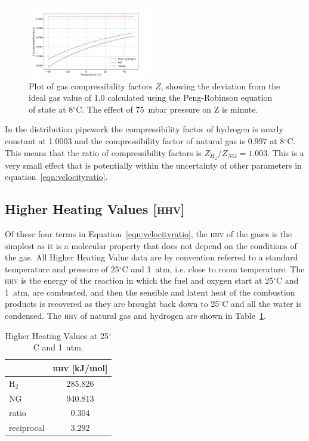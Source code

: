 \documentclass[5p]{elsarticle} %
\begin{document}
\begin{figure}[htbp]
\centering
\includegraphics[width=0.48\textwidth]{peng_z.png}
\caption{Plot of gas compressibility factors $Z$, showing the deviation from the ideal gas value of 1.0 calculated using the Peng-Robinson equation of state at 8$^\circ$C\citep{Sargents_github}. The effect of 75~mbar pressure on Z is minute.}
\label{fig:peng_z}
\end{figure}

In the distribution pipework the compressibility factor of hydrogen is nearly constant at 1.0003 and the compressibility factor of natural gas is 0.997 at 8$^\circ$C\citep{Sargents_github}.
This means that the ratio of compressibility factors is $Z_{H_2} / Z_{NG} = 1.003$.
This is a very small effect that is potentially within the uncertainty of other parameters in equation~\eqref{eqn:velocityratio}.

\subsection{Higher Heating Values \textsc{[hhv]}}
\label{sec:hhv}

Of these four terms in Equation~\eqref{eqn:velocityratio}, the \textsc{hhv} of the gases is the simplest as it is a molecular property that does not depend on the conditions of the gas.
All Higher Heating Value data are by convention referred to a standard temperature and pressure of 25$^\circ$C and 1~atm, i.e. close to room temperature.
The \textsc{hhv} is the energy of the reaction in which the fuel and oxygen start at 25$^\circ$C and 1~atm, are combusted, and then the sensible and latent heat of the combustion products is recovered as they are brought back down to 25$^\circ$C and all the water is condensed\citep{nist_delta_H}. 
The \textsc{hhv} of natural gas and hydrogen are shown in Table~\ref{tab:combust}.

\begin{table}[ht]
\centering
\begin{tabular}{l|c}
    & \textsc{hhv} [kJ/mol]\\
    \hline
    H$_2$ & 285.826 \\
    NG & 940.813 \\
    \hline
    ratio & 0.304  \\
    reciprocal & 3.292 \\
\end{tabular}
\caption{\label{tab:combust}Higher Heating Values at 25$^\circ$C and 1~atm.} 
\end{table}
\end{document}
